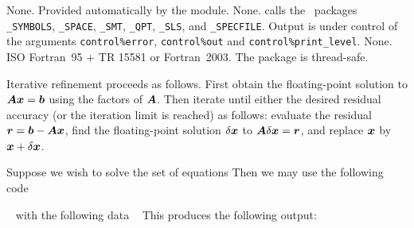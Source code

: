 \documentclass{galahad}
\newcommand{\packagename}{IR}
\begin{document}

\galgeneral

\galcommon None.
\galworkspace Provided automatically by the module.
\galroutines None.
\galmodules {\tt \packagename\_solve} calls the \galahad\ packages
{\tt \libraryname\_SY\-M\-BOLS},
{\tt \libraryname\_\-SPACE},
{\tt \libraryname\_\-SMT},
{\tt \libraryname\_\-QPT},
{\tt \libraryname\_SLS},
and
{\tt \libraryname\_SPECFILE}.
\galio Output is under control of the arguments
{\tt control\%error}, {\tt control\%out} and {\tt control\%print\_level}.
\galrestrictions None.
\galportability ISO Fortran~95 + TR 15581 or Fortran~2003.
The package is thread-safe.


\galmethod
Iterative refinement proceeds as follows. First obtain the floating-point
solution to ${\bm{A}} {\bm{x}} = {\bm{b}}$ using the factors of ${\bm{A}}$. Then iterate
until either the desired residual accuracy (or the iteration limit is
reached) as follows: evaluate the residual ${\bm{r}} = {\bm{b}} - {\bm{A}} {\bm{x}}$,
find the floating-point solution $\delta {\bm{x}}$ to ${\bm{A}} \delta {\bm{x}} = {\bm{r}}$,
and replace ${\bm{x}}$ by ${\bm{x}} + \delta {\bm{x}}$.


\galexample
Suppose we wish to solve the set of equations
Then we may use the following code

{\tt \small
\VerbatimInput{\packageexample}
}
\noindent
with the following data
{\tt \small
\VerbatimInput{\packagedata}
}
\noindent
This produces the following output:
{\tt \small
\VerbatimInput{\packageresults}
}
\end{document}
